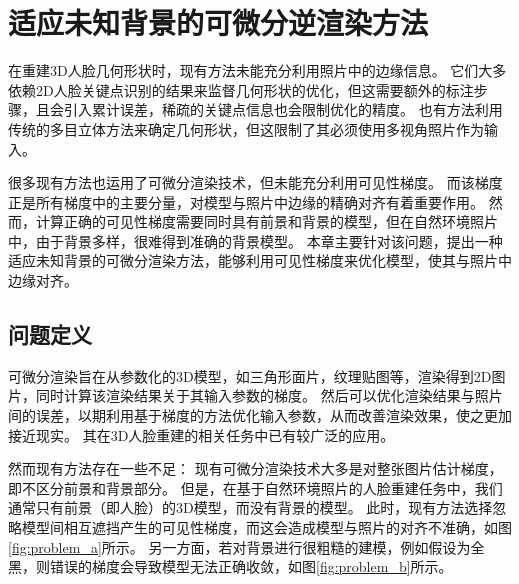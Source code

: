 \chapter{适应未知背景的可微分逆渲染方法}
\label{chap:method}

在重建3D人脸几何形状时，现有方法未能充分利用照片中的边缘信息。
它们大多依赖2D人脸关键点识别的结果来监督几何形状的优化，但这需要额外的标注步骤，且会引入累计误差，稀疏的关键点信息也会限制优化的精度。
也有方法利用传统的多目立体方法来确定几何形状，但这限制了其必须使用多视角照片作为输入。

很多现有方法也运用了可微分渲染技术，但未能充分利用可见性梯度。
而该梯度正是所有梯度中的主要分量，对模型与照片中边缘的精确对齐有着重要作用。
然而，计算正确的可见性梯度需要同时具有前景和背景的模型，但在自然环境照片中，由于背景多样，很难得到准确的背景模型。
本章主要针对该问题，提出一种适应未知背景的可微分渲染方法，能够利用可见性梯度来优化模型，使其与照片中边缘对齐。

\section{问题定义}

可微分渲染旨在从参数化的3D模型，如三角形面片，纹理贴图等，渲染得到2D图片，同时计算该渲染结果关于其输入参数的梯度。
然后可以优化渲染结果与照片间的误差，以期利用基于梯度的方法优化输入参数，从而改善渲染效果，使之更加接近现实。
其在3D人脸重建的相关任务中已有较广泛的应用。

然而现有方法存在一些不足：
现有可微分渲染技术大多是对整张图片估计梯度，即不区分前景和背景部分。
但是，在基于自然环境照片的人脸重建任务中，我们通常只有前景（即人脸）的3D模型，而没有背景的模型。
此时，现有方法选择忽略模型间相互遮挡产生的可见性梯度，而这会造成模型与照片的对齐不准确，如图\ref{fig:problem_a}所示。
另一方面，若对背景进行很粗糙的建模，例如假设为全黑，则错误的梯度会导致模型无法正确收敛，如图\ref{fig:problem_b}所示。

